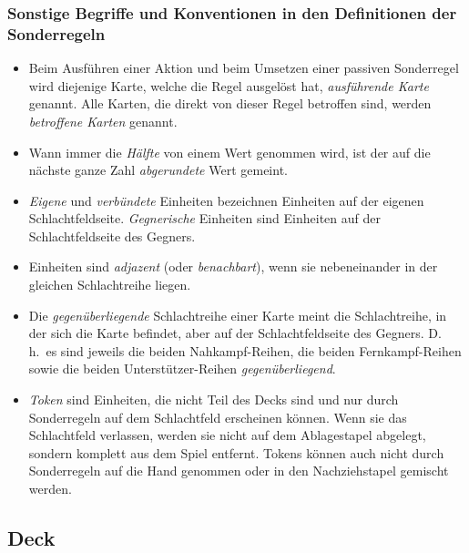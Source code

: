\documentclass[a4paper,11pt]{report}
\begin{document}
\subsubsection{Sonstige Begriffe und Konventionen in den Definitionen der Sonderregeln}
\begin{itemize}
	\item Beim Ausführen einer Aktion und beim Umsetzen einer passiven Sonderregel wird diejenige Karte, welche die Regel ausgelöst hat, \emph{ausführende Karte} genannt. Alle Karten, die direkt von dieser Regel betroffen sind, werden \emph{betroffene Karten} genannt.
	\item Wann immer die \emph{Hälfte} von einem Wert genommen wird, ist der auf die nächste ganze Zahl \emph{abgerundete} Wert gemeint.
	\item \emph{Eigene} und \emph{verbündete} Einheiten bezeichnen Einheiten auf der eigenen Schlachtfeldseite. \emph{Gegnerische} Einheiten sind Einheiten auf der Schlachtfeldseite des Gegners.
	\item Einheiten sind \emph{adjazent} (oder \emph{benachbart}), wenn sie nebeneinander in der gleichen Schlachtreihe liegen.
	\item Die \emph{gegenüberliegende} Schlachtreihe einer Karte meint die Schlachtreihe, in der sich die Karte befindet, aber auf der Schlachtfeldseite des Gegners. D.\,h.\ es sind jeweils die beiden Nahkampf-Reihen, die beiden Fernkampf-Reihen sowie die beiden Unterstützer-Reihen \emph{gegenüberliegend}. 
	\item \emph{Token} sind Einheiten, die nicht Teil des Decks sind und nur durch Sonderregeln auf dem Schlachtfeld erscheinen können. Wenn sie das Schlachtfeld verlassen, werden sie nicht auf dem Ablagestapel abgelegt, sondern komplett aus dem Spiel entfernt. Tokens können auch nicht durch Sonderregeln auf die Hand genommen oder in den Nachziehstapel gemischt werden.
\end{itemize}

\subsection{Deck}\label{ssec:Deck}
\end{document}
